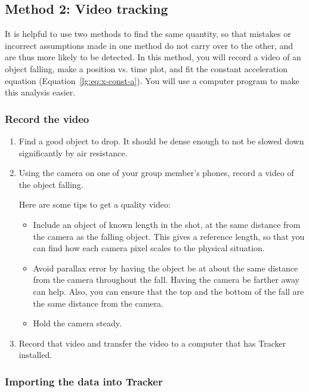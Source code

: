 \subsection{Method 2: Video tracking}

It is helpful to use two methods to find the same quantity, so that mistakes or incorrect assumptions made in one method do not carry over to the other, and are thus more likely to be detected. In this method, you will record a video of an object falling, make a position vs. time plot, and fit the constant acceleration equation (Equation~\ref{lg:eq:x-const-a}). You will use a computer program to make this analysis easier.

\subsubsection{Record the video}

\begin{enumerate}
	\item Find a good object to drop. It should be dense enough to not be slowed down significantly by air resistance.
	
	\item Using the camera on one of your group member's phones, record a video of the object falling.
	
	Here are some tips to get a quality video:
	\begin{itemize}
		\item Include an object of known length in the shot, at the same distance from the camera as the falling object. This gives a reference length, so that you can find how each camera pixel scales to the physical situation.
		
		\item Avoid parallax error by having the object be at about the same distance from the camera throughout the fall. Having the camera be farther away can help. Also, you can ensure that the top and the bottom of the fall are the same distance from the camera.
		
		\item Hold the camera steady.
	\end{itemize}

	\item Record that video and transfer the video to a computer that has Tracker installed.
\end{enumerate}

\subsubsection{Importing the data into Tracker}

